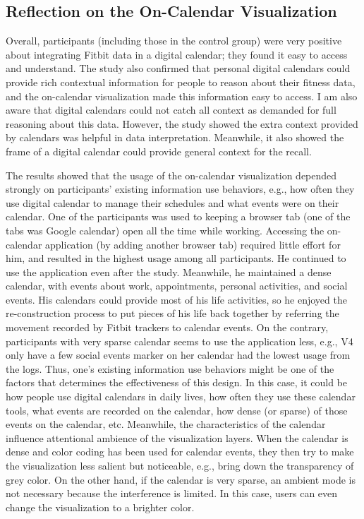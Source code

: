 \documentclass[12pt,oneside]{book}
\begin{document}
\subsection{Reflection on the On-Calendar Visualization}
Overall, participants (including those in the control group) were very positive about integrating Fitbit data in a digital calendar; they found it easy to access and understand. The study also confirmed that personal digital calendars could provide rich contextual information for people to reason about their fitness data, and the on-calendar visualization made this information easy to access. I am also aware that digital calendars could not catch all context as demanded for full reasoning about this data. However, the study showed the extra context provided by calendars was helpful in data interpretation. Meanwhile, it also showed the frame of a digital calendar could provide general context for the recall.

The results showed that the usage of the on-calendar visualization depended strongly on participants' existing information use behaviors, e.g., how often they use digital calendar to manage their schedules and what events were on their calendar. One of the participants was used to keeping a browser tab (one of the tabs was Google calendar) open all the time while working. Accessing the on-calendar application (by adding another browser tab) required little effort for him, and resulted in the highest usage among all participants. He continued to use the application even after the study. Meanwhile, he maintained a dense calendar, with events about work, appointments, personal activities, and social events. His calendars could provide most of his life activities, so he enjoyed the re-construction process to put pieces of his life back together by referring the movement recorded by Fitbit trackers to calendar events. On the contrary, participants with very sparse calendar seems to use the application less, e.g., V4 only have a few social events marker on her calendar had the lowest usage from the logs. Thus, one's existing information use behaviors might be one of the factors that determines the effectiveness of this design. In this case, it could be how people use digital calendars in daily lives, how often they use these calendar tools, what events are recorded on the calendar, how dense (or sparse) of those events on the calendar, etc. Meanwhile, the characteristics of the calendar influence attentional ambience of the visualization layers. When the calendar is dense and color coding has been used for calendar events, they then try to make the visualization less salient but noticeable, e.g., bring down the transparency of grey color. On the other hand, if the calendar is very sparse, an ambient mode is not necessary because the interference is limited. In this case, users can even change the visualization to a brighter color.
\end{document}
